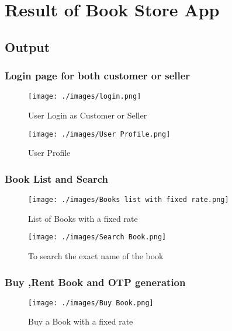 \chapter{Result of Book Store App }

\section{Output}

\subsection{Login page for both customer or seller}

\begin{figure}[h]\centering
	\texttt{[image: ./images/login.png]}
	\caption{User Login as Customer or Seller}\label{login}
\end{figure}



\begin{figure}[h]\centering
	\texttt{[image: ./images/User Profile.png]}
	\caption{User Profile}\label{profile}
\end{figure}

\pagebreak

\subsection{Book List and Search}
\begin{figure}[h]\centering
	\texttt{[image: ./images/Books list with fixed rate.png]}
	\caption{List of Books with a fixed rate}\label{Book list}
\end{figure}

\begin{figure}[h]\centering
	\texttt{[image: ./images/Search Book.png]}
	\caption{To search the exact name of the book}\label{search book}
\end{figure}

\pagebreak

\subsection{Buy ,Rent Book and OTP generation}
\begin{figure}[h]\centering
	\texttt{[image: ./images/Buy Book.png]}
	\caption{Buy a Book with a fixed rate}\label{Buy Book}
\end{figure}

